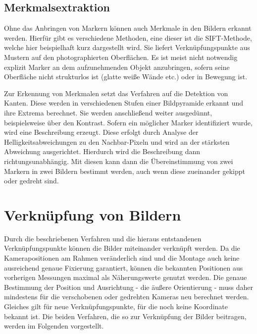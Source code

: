 \documentclass[./00PhotoBox.tex]{subfiles}
\begin{document}
\subsection{Merkmalsextraktion}
Ohne das Anbringen von Markern können auch Merkmale in den Bildern erkannt werden. Hierfür gibt es verschiedene Methoden, eine dieser ist die SIFT-Methode, welche hier beispielhaft kurz dargestellt wird. Sie liefert Verknüpfungspunkte aus Mustern auf den photographierten Oberflächen. Es ist meist nicht notwendig explizit Marker an dem aufzunehmenden Objekt anzubringen, sofern seine Oberfläche nicht strukturlos ist (glatte weiße Wände etc.) oder in Bewegung ist.

Zur Erkennung von Merkmalen setzt das Verfahren auf die Detektion von Kanten. Diese werden in verschiedenen Stufen einer Bildpyramide erkannt und ihre Extrema berechnet. Sie werden anschließend weiter ausgedünnt, beispielsweise über den Kontrast. Sofern ein möglicher Marker identifiziert wurde, wird eine Beschreibung erzeugt. Diese erfolgt  durch Analyse der Helligkeitsabweichungen zu den Nachbar-Pixeln und wird an der stärksten Abweichung ausgerichtet. Hierdurch wird die Beschreibung dann richtungsunabhängig. Mit diesen kann dann die Übereinstimmung von zwei Markern in zwei Bildern bestimmt werden, auch wenn diese zueinander gekippt oder gedreht sind.
\citep[S. 484f]{luhmann}

\section{Verknüpfung von Bildern}
\label{s:photogramm}
Durch die beschriebenen Verfahren und die hieraus entstandenen Verknüpfungs\-punkte können die Bilder miteinander verknüpft werden. Da die Kamerapositionen am Rahmen veränderlich sind und die Montage auch keine ausreichend genaue Fixierung garantiert, können die bekannten Positionen aus vorherigen Messungen maximal als Näherungswerte genutzt werden. Die genaue Bestimmung der Position und Ausrichtung - die äußere Orientierung - muss daher mindestens für die verschobenen oder gedrehten Kameras neu berechnet werden. Gleiches gilt für neue Verknüpfungspunkte, für die noch keine Koordinate bekannt ist. Die beiden Verfahren, die so zur Verknüpfung der Bilder beitragen, werden im Folgenden vorgestellt.
\end{document}

